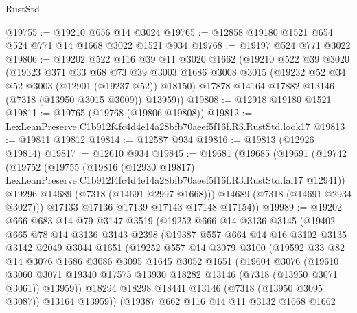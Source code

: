 \begin{lexlean}{RustStd}
\begin{coremodule}
@19755 := @19210 @656 @14 @3024
@19765 := @12858 @19180 @1521 @654 @524 @771 @14 @1668 @3022 @1521 @934
@19768 := @19197 @524 @771 @3022
@19806 := @19202
    @522
    @116
    @39
    @11
    @3020
    @1662
    (@19210
      @522
      @39
      @3020
      (@19323
        @371
        @33
        @68
        @73
        @39
        @3003
        @1686
        @3008
        @3015
        (@19232 @52 @34 @52 @3003 (@12901 (@19237 @52)) @18150)
        @17878
        @14164
        @17882
        @13146
        (@7318 (@13950 @3015 @3009))
        @13959))
@19808 := @12918 @19180 @1521
@19811 := @19765 (@19768 (@19806 @19808))
@19812 := LexLeanPreserve.C1b912f4fc4d4e14a28bfb70aeef5f16f.R3.RustStd.look17
@19813 := @19811 @19812
@19814 := @12587 @934
@19816 := @19813 (@12926 @19814)
@19817 := @12610 @934
@19845 := @19681
    (@19685
      (@19691
        (@19742
          (@19752
            (@19755
              (@19816
                (@12930 @19817)
                LexLeanPreserve.C1b912f4fc4d4e14a28bfb70aeef5f16f.R3.RustStd.fal17
                @12941))
            @19296
            @14689
            (@7318 (@14691 @2997 @1668)))
          @14689
          (@7318 (@14691 @2934 @3027)))
        @17133
        @17136
        @17139
        @17143
        @17148
        @17154))
@19989 := @19202
    @666
    @683
    @14
    @79
    @3147
    @3519
    (@19252
      @666
      @14
      @3136
      @3145
      (@19402
        @665
        @78
        @14
        @3136
        @3143
        @2398
        (@19387
          @557
          @664
          @14
          @16
          @3102
          @3135
          @3142
          @2049
          @3044
          @1651
          (@19252
            @557
            @14
            @3079
            @3100
            (@19592
              @33
              @82
              @14
              @3076
              @1686
              @3086
              @3095
              @1645
              @3052
              @1651
              (@19604
                @3076
                (@19610
                  @3060
                  @3071
                  @19340
                  @17575
                  @13930
                  @18282
                  @13146
                  (@7318 (@13950 @3071 @3061))
                  @13959))
              @18294
              @18298
              @18441
              @13146
              (@7318 (@13950 @3095 @3087))
              @13164
              @13959))
          (@19387
            @662
            @116
            @14
            @11
            @3132
            @1668
            @1662

\end{coremodule}
\end{lexlean}
